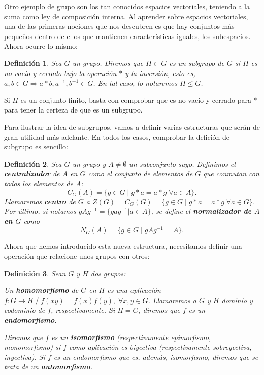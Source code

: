 \documentclass[11pt,a4paper,twoside,pdf]{article}
\numberwithin{equation}{section}
\newtheorem{definition}{Definición}
\begin{document}
	Otro ejemplo de grupo son los tan conocidos espacios vectoriales, teniendo a la suma como ley de composición interna. Al aprender sobre espacios vectoriales, una de las primeras nociones que nos descubren es que hay conjuntos más pequeños dentro de ellos que mantienen características iguales, los subespacios. Ahora ocurre lo mismo:
	
		\begin{definition} \label{def: subgrupo}
			Sea $G$ un grupo. Diremos que $H\subset G$ es un subgrupo de $G$ si $H$ es no vacío y cerrado bajo la operación $\ast$ y la inversión, esto es,  $a,b\in G\Rightarrow a\ast b , a^{-1}, b^{-1} \in G$. En tal caso, lo notaremos $H\le G$.
		\end{definition}
	
	Si $H$ es un conjunto finito, basta con comprobar que es no vacío y cerrado para $\ast$ para tener la certeza de que es un subgrupo.
	
	Para ilustrar la idea de subgrupos, vamos a definir varias estructuras que serán de gran utilidad más adelante. En todos los casos, comprobar la defición de subgrupo es sencillo:
	
		\begin{definition}
			Sea $G$ un grupo y $A\ne \emptyset$ un subconjunto suyo. Definimos el \textbf{centralizador} de $A$ en $G$ como el conjunto de elementos de $G$ que conmutan con todos los elementos de $A$:
			\[ C_G(A) = \{g \in G \; | \; g\ast a=a\ast g \; \forall a\in A  \}. \]
			Llamaremos \textbf{centro} de $G$ a $Z(G) = C_G(G) =  \{g \in G \; | \; g\ast a=a\ast g \; \forall a\in G  \}$. \\
			Por último, si notamos $gAg^{-1}=\{gag^{-1} | a \in A\}$, se define el \textbf{normalizador de $A$ en $G$} como
			\[ N_G(A) = \{g\in G \; | \; gAg^{-1}=A\}. \]
		\end{definition}
	
	Ahora que hemos introducido esta nueva estructura, necesitamos definir una operación que relacione unos grupos con otros:
	
		\begin{definition}
			Sean $G$ y $H$ dos grupos:
			
			\noindent Un \textbf{homomorfismo} de $G$ en $H$ es una aplicación $ f : G \longrightarrow H \;/\; f(xy) = f(x)f(y), \; \forall x, y \in G $. Llamaremos a $G$ y $H$ dominio y codominio de $f$, respectivamente. Si $H=G$, diremos que $f$ es un \textbf{endomorfismo}. 
			
			\noindent Diremos que $f$ es un \textbf{isomorfismo} (respectivamente epimorfismo, monomorfismo) si $f$ como aplicación es biyectiva (respectivamente sobreyectiva, inyectiva). Si $f$ es un endomorfismo que es, además, isomorfismo, diremos que se trata de un \textbf{automorfismo}.
		\end{definition}
	
\end{document}
